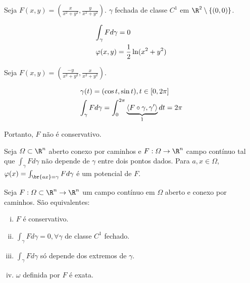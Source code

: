 \documentclass[11pt, oneside, a4paper]{gsm-l}
\begin{document}
\begin{exem}
Seja $F(x,y) = \left( {\frac{x}{{x^2  + y^2 }},\frac{y}{{x^2  + y^2 }}} \right)$. $\gamma$ fechada de classe $C^1$ em $\R^2 \setminus \{ (0,0) \}$.

\[
\begin{gathered}
  \int_\gamma Fd\gamma = 0 \hfill \\
  \varphi(x,y) = \frac{1}{2} \ln(x^2 + y^2) \hfill \\ 
\end{gathered} 
\]
\end{exem}

\begin{exem}
Seja $F(x,y) = \left( \frac{-y}{x^2 + y^2},\frac{x}{x^2 + y^2} \right)$.

\[
\begin{gathered}
  \gamma(t) = (\cos t, \sin t), t \in [0,2\pi] \hfill \\
  \int_\gamma Fd\gamma = \int_0^{2\pi} {\underbrace {\left\langle {F \circ \gamma ,\gamma '} \right\rangle }_1dt} = 2\pi \hfill \\ 
\end{gathered} 
\]

Portanto, $F$ não é conservativo.
\end{exem}

\begin{teo}
Seja $\varOmega \subset \R^n$ aberto conexo por caminhos e $F:\varOmega \to \R^n$ campo contínuo tal que $\int_\gamma Fd\gamma$ não depende de $\gamma$ entre dois pontos dados. Para $a,x \in \varOmega$, $\varphi (x) = \int_{\br{ax}  = \gamma } {Fd\gamma }$ é um potencial de $F$.
\end{teo}

\begin{teo}
Seja $F:\varOmega \subset \R^n \to \R^n$ um campo contínuo em $\varOmega$ aberto e conexo por caminhos. São equivalentes:

\begin{enumerate}[(i)]
 \item $F$ é conservativo.
 \item $\int_\gamma Fd\gamma = 0, \forall \gamma$ de classe $C^1$ fechado.
 \item $\int_\gamma Fd\gamma$ s\'o depende dos extremos de $\gamma$.
 \item $\omega$ definida por $F$ é exata.
\end{enumerate}

\end{teo}
\end{document}
